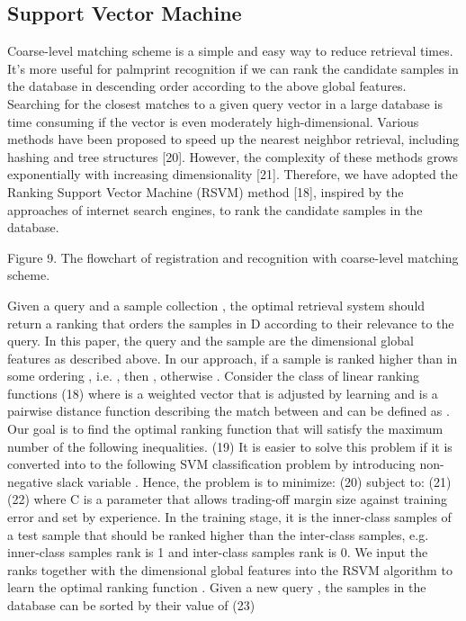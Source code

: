 \subsection{Support Vector Machine}
\label{ssec:methodology:svm}

Coarse-level matching scheme is a simple and easy way to reduce retrieval times. It’s more useful for palmprint recognition if we can rank the candidate samples in the database in descending order according to the above global features. Searching for the closest matches to a given query vector in a large database is time consuming if the vector is even moderately high-dimensional. Various methods have been proposed to speed up the nearest neighbor retrieval, including hashing and tree structures [20]. However, the complexity of these methods grows exponentially with increasing dimensionality [21]. Therefore, we have adopted the Ranking Support Vector Machine (RSVM) method [18], inspired by the approaches of internet search engines, to rank the candidate samples in the database.

Figure 9. The flowchart of registration and recognition with coarse-level matching scheme.

Given a query   and a sample collection , the optimal retrieval system should return a ranking   that orders the samples in D according to their relevance to the query. In this paper, the query   and the sample   are the   dimensional global features as described above. In our approach, if a sample   is ranked higher than   in some ordering  , i.e.  , then  , otherwise  . Consider the class of linear ranking functions
                           (18)
where   is a weighted vector that is adjusted by learning and   is a pairwise distance function describing the match between   and   can be defined as  . Our goal is to find the optimal ranking function that will satisfy the maximum number of the following inequalities.
                                (19)
It is easier to solve this problem if it is converted into to the following SVM classification problem by introducing non-negative slack variable  .
Hence, the problem is to minimize:
                                   (20)
subject to:
                       (21)
                                              (22)
where C is a parameter that allows trading-off margin size against training error and   set by experience.
In the training stage, it is the inner-class samples of a test sample that should be ranked higher than the inter-class samples, e.g. inner-class samples rank is 1 and inter-class samples rank is 0. We input the ranks together with the   dimensional global features into the RSVM algorithm to learn the optimal ranking function  . Given a new query  , the samples in the database can be sorted by their value of
                                  (23)
